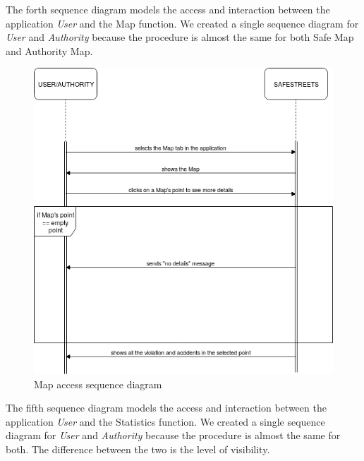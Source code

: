 \documentclass {article}
\begin{document}
		The forth sequence diagram models the access and interaction between the application {\it User} and the Map function. We created a single sequence diagram for {\it User} and {\it Authority} because the procedure is almost the same for both Safe Map and Authority Map.
		\begin{figure}[H]
			\centering
			\includegraphics[scale=0.55]{Images/Diagrams/57SeqDiagram.png}
			\caption{Map access sequence diagram}
		\end{figure}
		The fifth sequence diagram models the access and interaction between the application {\it User} and the Statistics function. We created a single sequence diagram for  {\it User} and {\it Authority} because the procedure is almost the same for both. The difference between the two is the level of visibility.
\end{document}
